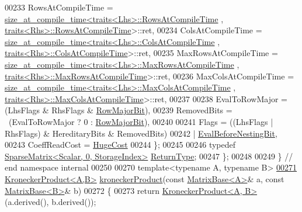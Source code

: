 \begin{DoxyCode}
00233     RowsAtCompileTime = \hyperlink{struct_eigen_1_1internal_1_1size__at__compile__time}{size\_at\_compile\_time<traits<Lhs>::RowsAtCompileTime}
      , \hyperlink{struct_eigen_1_1internal_1_1traits}{traits<Rhs>::RowsAtCompileTime}>::ret,
00234     ColsAtCompileTime = \hyperlink{struct_eigen_1_1internal_1_1size__at__compile__time}{size\_at\_compile\_time<traits<Lhs>::ColsAtCompileTime}
      , \hyperlink{struct_eigen_1_1internal_1_1traits}{traits<Rhs>::ColsAtCompileTime}>::ret,
00235     MaxRowsAtCompileTime = 
      \hyperlink{struct_eigen_1_1internal_1_1size__at__compile__time}{size\_at\_compile\_time<traits<Lhs>::MaxRowsAtCompileTime}
      , \hyperlink{struct_eigen_1_1internal_1_1traits}{traits<Rhs>::MaxRowsAtCompileTime}>::ret,
00236     MaxColsAtCompileTime = 
      \hyperlink{struct_eigen_1_1internal_1_1size__at__compile__time}{size\_at\_compile\_time<traits<Lhs>::MaxColsAtCompileTime}
      , \hyperlink{struct_eigen_1_1internal_1_1traits}{traits<Rhs>::MaxColsAtCompileTime}>::ret,
00237 
00238     EvalToRowMajor = (LhsFlags & RhsFlags & \hyperlink{group__flags_gae4f56c2a60bbe4bd2e44c5b19cbe8762}{RowMajorBit}),
00239     RemovedBits = ~(EvalToRowMajor ? 0 : \hyperlink{group__flags_gae4f56c2a60bbe4bd2e44c5b19cbe8762}{RowMajorBit}),
00240 
00241     Flags = ((LhsFlags | RhsFlags) & HereditaryBits & RemovedBits)
00242           | \hyperlink{group__flags_gaa34e83bae46a8eeae4e69ebe3aaecbed}{EvalBeforeNestingBit},
00243     CoeffReadCost = \hyperlink{namespace_eigen_a3163430a1c13173faffde69016b48aaf}{HugeCost}
00244   \};
00245 
00246   \textcolor{keyword}{typedef} \hyperlink{group___sparse_core___module_class_eigen_1_1_sparse_matrix}{SparseMatrix<Scalar, 0, StorageIndex>} 
      \hyperlink{group___sparse_core___module_class_eigen_1_1_sparse_matrix}{ReturnType};
00247 \};
00248 
00249 \} \textcolor{comment}{// end namespace internal}
00250 
00270 \textcolor{keyword}{template}<\textcolor{keyword}{typename} A, \textcolor{keyword}{typename} B>
\hyperlink{namespace_eigen_aedd4b7cd1e324ed0769cac2701f4d050}{00271} \hyperlink{class_eigen_1_1_kronecker_product}{KroneckerProduct<A,B>} \hyperlink{namespace_eigen_aedd4b7cd1e324ed0769cac2701f4d050}{kroneckerProduct}(\textcolor{keyword}{const} 
      \hyperlink{group___core___module_class_eigen_1_1_matrix_base}{MatrixBase<A>}& a, \textcolor{keyword}{const} \hyperlink{group___core___module_class_eigen_1_1_matrix_base}{MatrixBase<B>}& b)
00272 \{
00273   \textcolor{keywordflow}{return} \hyperlink{class_eigen_1_1_kronecker_product}{KroneckerProduct<A, B>}(a.derived(), b.derived());

\end{DoxyCode}
